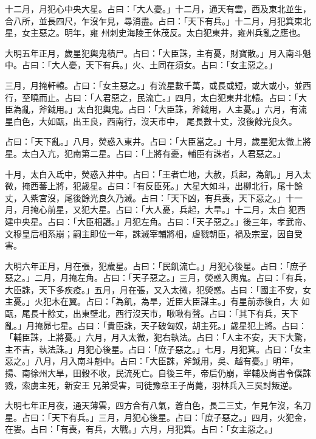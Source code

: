 \begin{pinyinscope}
 十二月，月犯心中央大星。占曰：「大人憂。」十二月，通天有雲，西及東北並生，合八所，並長四尺，乍沒乍見，尋消盡。占曰：「天下有兵。」十二月，月犯箕東北星，女主惡之。明年，雍
 州刺史海陵王休茂反。太白犯東井，雍州兵亂之應也。



 大明五年正月，歲星犯輿鬼積尸。占曰：「大臣誅，主有憂，財寶散。」月入南斗魁中。占曰：「大人憂，天下有兵。」火、土同在須女。占曰：「女主惡之。」



 三月，月掩軒轅。占曰：「女主惡之。」有流星數千萬，或長或短，或大或小，並西行，至曉而止。占曰：「人君惡之，民流亡。」四月，太白犯東井北轅。占曰：「大臣為亂，斧鉞用。」太白犯輿鬼。占曰：「大臣誅，斧鉞用，人主憂。」六月，有流星白色，大如甌，出王良，西南行，沒天市中，
 尾長數十丈，沒後餘光良久。



 占曰：「天下亂。」八月，熒惑入東井。占曰：「大臣當之。」十月，歲星犯太微上將星。太白入亢，犯南第二星。占曰：「上將有憂，輔臣有誅者，人君惡之。」



 十月，太白入氐中，熒惑入井中。占曰：「王者亡地，大赦，兵起，為飢。」月入太微，掩西蕃上將，犯歲星。占曰：「有反臣死。」大星大如斗，出柳北行，尾十餘丈，入紫宮沒，尾後餘光良久乃滅。占曰：「天下凶，有兵喪，天下惡之。」十一月，月掩心前星，又犯大星。占曰：「大人憂，兵起，大旱。」十二月，太白
 犯西建中央星。占曰：「大臣相譖。」月犯左角。占曰：「天子惡之。」後三年，孝武帝、文穆皇后相系崩；嗣主即位一年，誅滅宰輔將相，虐戮朝臣，禍及宗室，因自受害。



 大明六年正月，月在張，犯歲星。占曰：「民飢流亡。」月犯心後星。占曰：「庶子惡之。」二月，月掩左角。占曰：「天子惡之。」三月，熒惑入輿鬼。占曰：「有兵，大臣誅，天下多疾疫。」五月，月在張，又入太微，犯熒惑。占曰：「國主不安，女主憂。」火犯木在翼。占曰：「為飢，為旱，近臣大臣謀主。」有星前赤後白，大
 如甌，尾長十餘丈，出東壁北，西行沒天市，啾啾有聲。占曰：「其下有兵，天下亂。」月掩昴七星。占曰：「貴臣誅，天子破匈奴，胡主死。」歲星犯上將。占曰：「輔臣誅，上將憂。」六月，月入太微，犯右執法。占曰：「人主不安，天下大驚，主不吉，執法誅。」月犯心後星。占曰：「庶子惡之。」七月，月犯箕。占曰：「女主惡之。」八月，月入南斗魁中。占曰：「大臣誅，斧鉞用，吳、越有憂。」明年，揚、南徐州大旱，田穀不收，民流死亡。自後三年，帝后仍崩，宰輔及尚書令僕誅戮，索虜主死，新安王
 兄弟受害，司徒豫章王子尚薨，羽林兵入三吳討叛逆。



 大明七年正月夜，通天薄雲，四方合有八氣，蒼白色，長二三丈，乍見乍沒，名刀星。占曰：「天下有兵。」三月，月犯心後星。占曰：「庶子惡之。」四月，火犯金，在婁。占曰：「有喪，有兵，大戰。」六月，月犯箕。占曰：「女主惡之。」




\end{pinyinscope}
